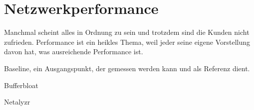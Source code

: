 \chapter{Netzwerkperformance}
\label{cha:netz-performance}

\begin{abstractsec}
  Manchmal scheint alles in Ordnung zu sein und trotzdem sind die Kunden nicht
  zufrieden. Performance ist ein heikles Thema, weil jeder seine eigene
  Vorstellung davon hat, was ausreichende Performance ist.
\end{abstractsec}

\begin{notes}
\item Baseline, ein Ausgangspunkt, der gemessen werden kann und als Referenz
  dient.
\item Bufferbloat
\item Netalyzr
\end{notes}










